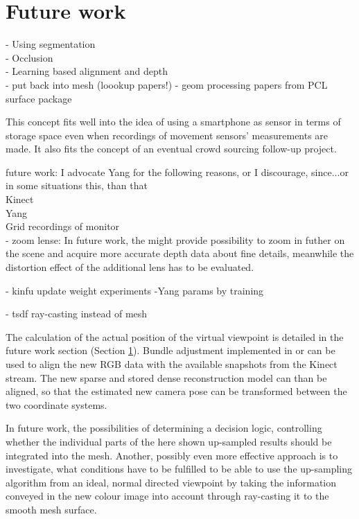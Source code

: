 \documentclass{ucl_thesis}
\newcommand{\secref}[1]{(Section \ref{#1})}
\begin{document}
\section{Future work}
\label{sec:future_work}

- Using segmentation \citep{Silberman:ECCV12} \\
- Occlusion \citep{Hoiem:2011} \\
- Learning based alignment and depth \citep{Herrera:LearnedJointMRF} \\
- put back into mesh (loookup papers!)
- geom processing papers from PCL surface package

This concept fits well into the idea of using a smartphone as sensor in terms of storage space even when recordings of movement sensors' measurements are made. It also fits the concept of an eventual crowd sourcing follow-up project. 

future work: I advocate Yang for the following reasons, or I discourage, since...or in some situations this, than that \\
Kinect \\
Yang \\
Grid recordings of monitor\\

    - zoom lense: \citep{Kinect_nyko_zoom}
In future work, the \citep{Kinect_nyko_zoom} might provide possibility to zoom in futher on the scene and acquire more accurate depth data about fine details, meanwhile the distortion effect of the additional lens has to be evaluated.

- kinfu update weight experiments
-Yang params by training

- tsdf ray-casting instead of mesh

\par The calculation of the actual position of the virtual viewpoint is detailed in the future work section \secref{sec:future_work}. Bundle adjustment implemented in \citep{SnavelySS06} or \citep{vsfm} can be used to align the new RGB data with the available snapshots from the Kinect stream. The new sparse and stored dense reconstruction model can than be aligned, so that the estimated new camera pose can be transformed between the two coordinate systems.

 In future work, the possibilities of determining a decision logic, controlling whether the individual parts of the here shown up-sampled results should be integrated into the mesh. Another, possibly even more effective approach is to investigate, what conditions have to be fulfilled to be able to use the up-sampling algorithm from an ideal, normal directed viewpoint by taking the information conveyed in the new colour image into account through ray-casting it to the smooth mesh surface.
\end{document}
